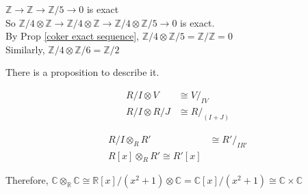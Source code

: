 \begin{example}
     $ \mathbb{Z}\rightarrow \mathbb{Z}\rightarrow \mathbb{Z}/5\rightarrow 0 $ is exact\\
     So  $ \mathbb{Z}/4\otimes \mathbb{Z}\rightarrow \mathbb{Z}/4\otimes \mathbb{Z}\rightarrow \mathbb{Z}/4\otimes \mathbb{Z}/5\rightarrow 0 $ is exact.\\
     By Prop \ref{coker exact sequence},  $ \mathbb{Z}/4\otimes \mathbb{Z}/5=\mathbb{Z}/\mathbb{Z}=0 $ \\
     Similarly,  $ \mathbb{Z}/4\otimes \mathbb{Z}/6=\mathbb{Z}/2 $ 
\end{example}
There is a proposition to describe it.
\begin{proposition}
    \begin{align*}
        R/I\otimes V&\cong V/_{IV}\\
        R/I\otimes R/J&\cong R/_{(I+J)}
    \end{align*}
\end{proposition}
\begin{proposition}
    \begin{align*}
        R/I\otimes_R R'&\cong R'/_{IR'}\\
        R[x]\otimes_R  R'\cong R'[x]
    \end{align*}
\end{proposition}
Therefore,  $ \mathbb{C}\otimes_\mathbb{R}\mathbb{C}\cong \mathbb{R}[x]/(x^2+1)\otimes \mathbb{C}=\mathbb{C}[x]/(x^2+1)\cong \mathbb{C}\times \mathbb{C} $  
